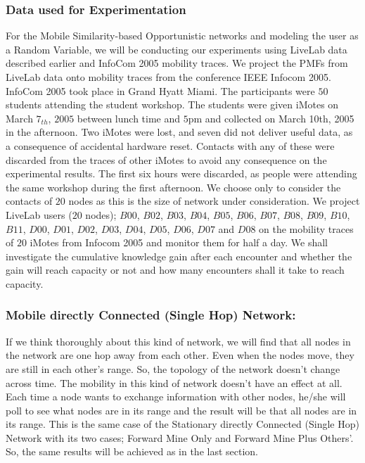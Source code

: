 \documentclass[11pt]{article}
\begin{document}
\subsubsection{Data used for Experimentation}
For the Mobile Similarity-based Opportunistic networks and modeling the user as a Random Variable, we will be conducting our experiments using LiveLab data \cite{data} described earlier and InfoCom 2005 mobility traces. We project the PMFs from LiveLab data onto mobility traces \cite{infocom} from the conference IEEE Infocom 2005. InfoCom 2005 took place in Grand Hyatt Miami. The participants were $50$ students attending the student workshop. The students were given iMotes on March $7_{th}$, $2005$ between lunch time and $5$pm and collected on March 10th, 2005 in the afternoon. Two iMotes were lost, and seven did not deliver useful data, as a consequence of accidental hardware reset. Contacts with any of these were discarded from the traces of other iMotes to avoid any consequence on the experimental results. The first six hours were discarded, as people were attending the same workshop during the first afternoon. We choose only to consider the contacts of $20$ nodes as this is the size of network under consideration. We project LiveLab users ($20$ nodes); $B00$, $B02$, $B03$,
$B04$, $B05$, $B06$, $B07$, $B08$, $B09$, $B10$, $B11$, $D00$, $D01$, $D02$, $D03$, $D04$, $D05$, $D06$, $D07$ and $D08$ on the mobility traces of $20$ iMotes from Infocom 2005 and monitor them for half a day. We shall investigate the cumulative knowledge gain after each encounter and whether the gain will reach capacity or not and how many encounters shall it take to reach capacity. 

\subsubsection{ Mobile directly Connected (Single Hop) Network:}
If we think thoroughly about this kind of network, we will find that all nodes in the network are one hop away from each other. Even when the nodes move, they are still in each other's range. So, the topology of the network doesn't change across time. The mobility in this kind of network doesn't have an effect at all. Each time a node wants to exchange information with other nodes, he/she will poll to see what nodes are in its range and the result will be that all nodes are in its range. This is the same case of the Stationary directly Connected (Single Hop) Network with its two cases; Forward Mine Only and Forward Mine Plus Others'. So, the same results will be achieved as in the last section. 
\end{document}
